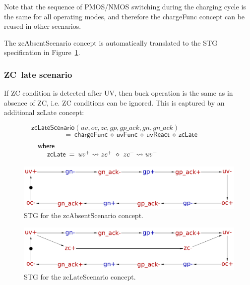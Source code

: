 \documentclass[british, journal]{IEEEtran}
\begin{document}
Note that the sequence of PMOS/NMOS switching during the charging cycle is the same
for all operating modes, and therefore the \textsf{chargeFunc} concept can be reused
in other scenarios.

The \textsf{zcAbsentScenario} concept is automatically translated to the STG specification
in Figure~\ref{fig:zcAbsentScenario STG}.

\subsubsection{ZC~late scenario}

If ZC condition is detected after UV, then buck operation is the same as in
absence of ZC, i.e. ZC conditions can be ignored. This is captured by an additional
\textsf{zcLate} concept:

\vspace{-5mm}
\[
\mathsf{zcLateScenario}(uv,oc,zc,gp,gp\_ack,gn,gn\_ack)~~~~~~~~~~~~~~~~~~~~~~~~~~~~~~~
\]
\vspace{-6mm}
\[
~~=~\mathsf{chargeFunc}~\diamond~\mathsf{uvFunc}~\diamond~\mathsf{uvReact}~\diamond~\mathsf{zcLate}
\]
\vspace{-5mm}
\[
\begin{array}{lcl}
\mathsf{where}&~&\\

~~~~\mathsf{zcLate}&\hspace{-2mm}=&\hspace{-2mm}uv^{+}\rightsquigarrow zc^{+}~\diamond~ zc^{-}\rightsquigarrow uv^{-}~~~~~~~~~~~~~~~~~~~~~~~~~~~

\end{array}
\]

\begin{figure}
\begin{centering}
\includegraphics[scale=0.23]{Images/stg-UV_without_ZC}
\par\end{centering}
\protect\caption{\label{fig:zcAbsentScenario STG} STG for the \textsf{zcAbsentScenario} concept.}
\vspace{-4mm}
\end{figure}

\begin{figure}
\begin{centering}
\includegraphics[scale=0.23]{Images/stg-UV_before_ZC}
\par\end{centering}
\protect\caption{\label{fig:zcLateScenario STG}STG for the \textsf{zcLateScenario} concept.}
\vspace{-4mm}
\end{figure}
\end{document}

